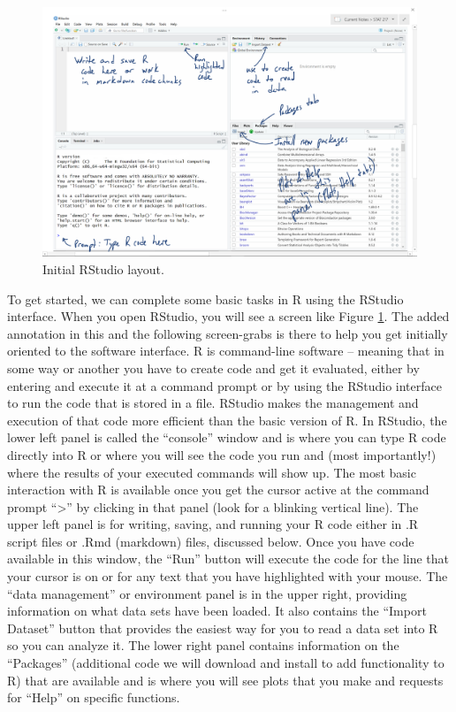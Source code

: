 \documentclass[
]{book}
\begin{document}
\begin{figure}[ht!]

{\centering \includegraphics[width=1\linewidth]{chapter1_files/fig1-2} 

}

\caption{Initial RStudio layout.}\label{fig:Figure1-2}
\end{figure}

\newpage

\indent To get started, we can complete some basic tasks in R using the RStudio
interface. When you open RStudio, you will see a screen like Figure
\ref{fig:Figure1-2}. The
added annotation in this and the following screen-grabs is there to help you
get initially oriented to the software interface. R is command-line software --
meaning that in some way or another you have to create code and get it evaluated,
either by entering and execute it at a command prompt or by using the RStudio
interface to run the code that is stored in a file. RStudio makes the management and
execution of that code more efficient than the basic version of R. In RStudio,
the lower left panel is called the ``console'' window and is where you can type R
code directly into R or where you will see the code you run and (most
importantly!) where the results of your executed commands will show up. The
most basic interaction with R is available once you get the cursor active at
the command prompt ``\textgreater{}'' by clicking in that panel (look for a blinking
vertical line). The upper left panel is for writing, saving, and running your R
code either in .R script files or .Rmd (markdown) files, discussed below. Once
you have code available in this window, the ``Run'' button will
execute the code for the line that your cursor is on or for any text that you
have highlighted with your mouse. The ``data management'' or environment panel is
in the upper right, providing information on what data sets have been loaded.
It also contains the ``Import Dataset'' button that provides the easiest way for
you to read a data set into R so you can analyze it. The lower right panel
contains information on the ``Packages'' (additional code we will download and
install to add functionality to R) that are available and is where you will see
plots that you make and requests for ``Help'' on specific functions.
\end{document}
